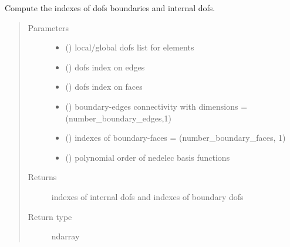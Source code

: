 \documentclass[letterpaper,10pt,english]{sphinxmanual}
\begin{document}
\begin{fulllineitems}
\label{\detokenize{petgem/mesh:petgem.mesh.computeBoundaries}}
Compute the indexes of dofs boundaries and internal dofs.
\begin{quote}\begin{description}
\item[{Parameters}] \leavevmode\begin{itemize}
\item {} 
 () \textendash{} local/global dofs list for elements

\item {} 
 () \textendash{} dofs index on edges

\item {} 
 () \textendash{} dofs index on faces

\item {} 
 () \textendash{} boundary-edges connectivity with dimensions = (number\_boundary\_edges,1)

\item {} 
 () \textendash{} indexes of boundary-faces = (number\_boundary\_faces, 1)

\item {} 
 () \textendash{} polynomial order of nedelec basis functions

\end{itemize}

\item[{Returns}] \leavevmode
indexes of internal dofs and indexes of boundary dofs

\item[{Return type}] \leavevmode
ndarray

\end{description}\end{quote}

\end{fulllineitems}
\end{document}
